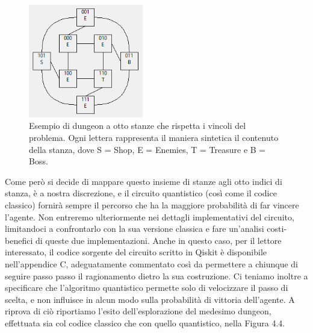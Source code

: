 \documentclass{book}
\theoremstyle{definition}
\theoremstyle{definition}
\theoremstyle{definition}
\theoremstyle{plain}
\theoremstyle{plain}
\theoremstyle{plain}
\theoremstyle{plain}
\begin{document}
\begin{figure}[H]
\captionsetup{font=scriptsize}
\begin{center}
    \includegraphics[width=5cm]{Immagini troppo complicate/Dungeon_usato.png}
\end{center}
\caption{\scriptsize Esempio di dungeon a otto stanze che rispetta i vincoli del problema. Ogni lettera rappresenta il maniera sintetica il contenuto della stanza, dove S = Shop, E = Enemies, T = Treasure e B = Boss.}\label{fig:img_dungeon_example}
\end{figure}
\noindent Come però si decide di mappare questo insieme di stanze agli otto indici di stanza, è a nostra discrezione, e il circuito quantistico (così come il codice classico) fornirà sempre il percorso che ha la maggiore probabilità di far vincere l'agente. Non entreremo ulteriormente nei dettagli implementativi del circuito, limitandoci a confrontarlo con la sua versione classica e fare un'analisi costi-benefici di queste due implementazioni. Anche in questo caso, per il lettore interessato, il codice sorgente del circuito scritto in Qiskit è disponibile nell'appendice C, adeguatamente commentato così da permettere a chiunque di seguire passo passo il ragionamento dietro la sua costruzione. Ci teniamo inoltre a specificare che l'algoritmo quantistico permette solo di velocizzare il passo di scelta, e non influisce in alcun modo sulla probabilità di vittoria dell'agente. A riprova di ciò riportiamo l'esito dell'esplorazione del medesimo dungeon, effettuata sia col codice classico che con quello quantistico, nella Figura 4.4.\\
\end{document}
